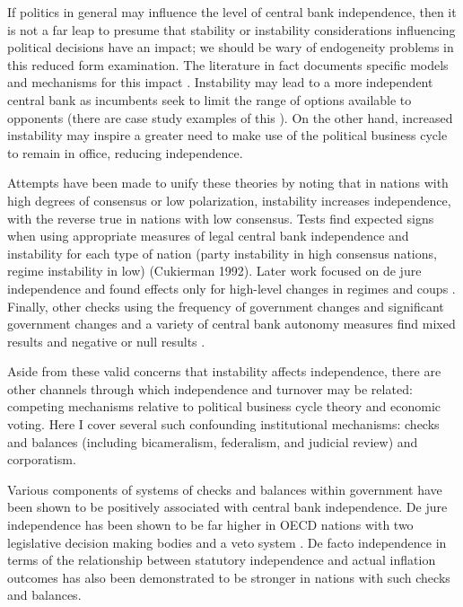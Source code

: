 \documentclass{article}
\begin{document}
    If politics in general may influence the level of central bank independence, then it is not a far leap to presume that stability or instability considerations influencing political decisions have an impact; we should be wary of endogeneity problems in this reduced form examination. The literature in fact documents specific models and mechanisms for this impact \citep{eijffinger_political_1996}. Instability may lead to a more independent central bank as incumbents seek to limit the range of options available to opponents (there are case study examples of this \citep{goodman_politics_1991}). On the other hand, increased instability may inspire a greater need to make use of the political business cycle to remain in office, reducing independence.
   
    Attempts have been made to unify these theories by noting that in nations with high degrees of consensus or low polarization, instability increases independence, with the reverse true in nations with low consensus. Tests find expected signs when using appropriate measures of legal central bank independence and instability for each type of nation (party instability in high consensus nations, regime instability in low) (Cukierman 1992). Later work focused on de jure independence and found effects only for high-level changes in regimes and coups \citep{cukierman_political_1995,haan_central_1996}. Finally, other checks using the frequency of government changes and significant government changes and a variety of central bank autonomy measures find mixed results and negative or null results \citep{de_haan_variation_1995}.
   
    Aside from these valid concerns that instability affects independence, there are other channels through which independence and turnover may be related: competing mechanisms relative to political business cycle theory and economic voting. Here I cover several such confounding institutional mechanisms: checks and balances (including bicameralism, federalism, and judicial review) and corporatism.
   
    Various components of systems of checks and balances within government have been shown to be positively associated with central bank independence. De jure independence has been shown to be far higher in OECD nations with two legislative decision making bodies and a veto system \citep{moser_checks_1999}. De facto independence in terms of the relationship between statutory independence and actual inflation outcomes has also been demonstrated to be stronger in nations with such checks and balances.
   
\end{document}
